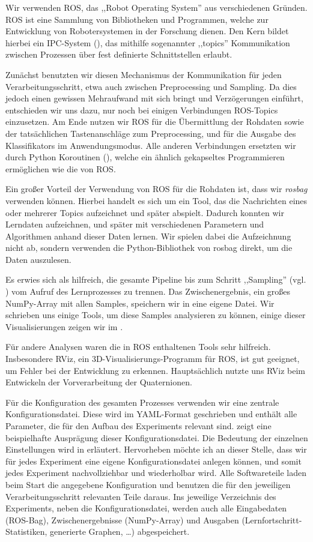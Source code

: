 Wir verwenden ROS, das ,,Robot Operating System'' aus verschiedenen Gründen.
ROS ist eine Sammlung von Bibliotheken und Programmen, welche zur Entwicklung
von Robotersystemen in der Forschung dienen. Den Kern bildet hierbei ein
IPC-System (), das mithilfe sogenannter
,,topics'' Kommunikation zwischen Prozessen über fest definierte Schnittstellen
erlaubt.

Zunächst benutzten wir diesen Mechanismus der Kommunikation für jeden
Verarbeitungsschritt, etwa auch zwischen Preprocessing und Sampling. Da dies
jedoch einen gewissen Mehraufwand mit sich bringt und Verzögerungen einführt,
entschieden wir uns dazu, nur noch bei einigen Verbindungen ROS-Topics
einzusetzen. Am Ende nutzen wir ROS für die Übermittlung der Rohdaten sowie der
tatsächlichen Tastenanschläge zum Preprocessing, und für die Ausgabe des
Klassifikators im Anwendungsmodus. Alle anderen Verbindungen ersetzten wir
durch Python Koroutinen (), welche ein ähnlich
gekapseltes Programmieren ermöglichen wie die  von
ROS.

Ein großer Vorteil der Verwendung von ROS für die Rohdaten ist, dass wir
\emph{rosbag} verwenden können. Hierbei handelt es sich um ein Tool, das die
Nachrichten eines oder mehrerer Topics aufzeichnet und später abspielt.
Dadurch konnten wir Lerndaten aufzeichnen, und später mit verschiedenen
Parametern und Algorithmen anhand dieser Daten lernen.  Wir spielen dabei die
Aufzeichnung nicht ab, sondern verwenden die Python-Bibliothek von
rosbag direkt, um die Daten auszulesen.

Es erwies sich als hilfreich, die gesamte Pipeline bis zum Schritt ,,Sampling''
(vgl. ) vom Aufruf des Lernprozesses zu trennen. Das
Zwischenergebnis, ein großes NumPy-Array mit allen Samples, speichern wir in
eine eigene Datei. Wir schrieben uns einige Tools, um diese Samples analysieren
zu können, einige dieser Visualisierungen zeigen wir im .

Für andere Analysen waren die in ROS enthaltenen Tools sehr hilfreich.
Insbesondere RViz, ein 3D-Visualisierungs-Programm für ROS, ist gut geeignet,
um Fehler bei der Entwicklung zu erkennen. Hauptsächlich nutzte uns RViz beim
Entwickeln der Vorverarbeitung der Quaternionen.

Für die Konfiguration des gesamten Prozesses verwenden wir eine zentrale
Konfigurationsdatei. Diese wird im YAML-Format geschrieben und enthält alle
Parameter, die für den Aufbau des Experiments relevant sind. 
zeigt eine beispielhafte Ausprägung dieser Konfigurationsdatei. Die Bedeutung
der einzelnen Einstellungen wird in \cite{caro} erläutert.  Hervorheben möchte
ich an dieser Stelle, dass wir für jedes Experiment eine eigene
Konfigurationsdatei anlegen können, und somit jedes Experiment nachvollziehbar
und wiederholbar wird. Alle Softwareteile laden beim Start die angegebene
Konfiguration und benutzen die für den jeweiligen Verarbeitungsschritt
relevanten Teile daraus.  Ins jeweilige Verzeichnis des Experiments, neben die
Konfigurationsdatei, werden auch alle Eingabedaten (ROS-Bag),
Zwischenergebnisse (NumPy-Array) und Ausgaben (Lernfortschritt-Statistiken,
generierte Graphen, \ldots) abgespeichert.

